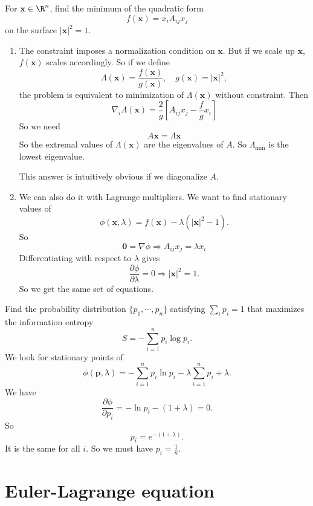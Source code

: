 \documentclass[a4paper]{article}
\begin{document}
\begin{eg}
  For $\mathbf{x}\in \R^n$, find the minimum of the quadratic form
  \[
    f(\mathbf{x}) = x_i A_{ij}x_j
  \]
  on the surface $|\mathbf{x}|^2 = 1$.

  \begin{enumerate}
  \item The constraint imposes a normalization condition on $\mathbf{x}$. But if we scale up $\mathbf{x}$, $f(\mathbf{x})$ scales accordingly. So if we define
    \[
      \Lambda(\mathbf{x}) = \frac{f(\mathbf{x})}{g(\mathbf{x})},\quad g(\mathbf{x}) = |\mathbf{x}|^2,
    \]
    the problem is equivalent to minimization of $\Lambda (\mathbf{x})$ without constraint. Then
    \[
      \nabla_i \Lambda(\mathbf{x}) = \frac{2}{g}\left[A_{ij} x_j - \frac{f}{g} x_i\right]
    \]
    So we need
    \[
      A\mathbf{x} = \Lambda \mathbf{x}
    \]
    So the extremal values of $\Lambda (\mathbf{x})$ are the eigenvalues of $A$. So $\Lambda_{\min}$ is the lowest eigenvalue.

    This answer is intuitively obvious if we diagonalize $A$.

  \item We can also do it with Lagrange multipliers. We want to find stationary values of
    \[
      \phi(\mathbf{x}, \lambda) = f(\mathbf{x}) - \lambda(|\mathbf{x}|^2 - 1).
    \]
    So
    \[
      \mathbf{0} = \nabla \phi \Rightarrow A_{ij} x_j = \lambda x_i
    \]
    Differentiating with respect to $\lambda$ gives
    \[
      \frac{\partial \phi}{\partial \lambda} = 0 \Rightarrow |\mathbf{x}|^2 = 1.
    \]
    So we get the same set of equations.
  \end{enumerate}
\end{eg}

\begin{eg}
  Find the probability distribution $\{p_1, \cdots, p_n\}$ satisfying $\sum_i p_i = 1$ that maximizes the information entropy
  \[
    S = - \sum_{i = 1}^n p_i \log p_i.
  \]
  We look for stationary points of
  \[
    \phi(\mathbf{p}, \lambda) = -\sum_{i = 1}^n p_i \ln p_i - \lambda\sum_{i = 1}^n p_i + \lambda.
  \]
  We have
  \[
    \frac{\partial \phi}{\partial p_i}= - \ln p_i - (1 + \lambda) = 0.
  \]
  So
  \[
    p_i = e^{-(1 + \lambda)}.
  \]
  It is the same for all $i$. So we must have $p_i = \frac{1}{n}$.
\end{eg}

\section{Euler-Lagrange equation}
\end{document}

